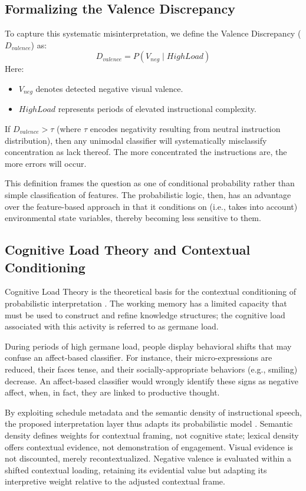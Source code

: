 \documentclass[conference]{IEEEtran}
\begin{document}
\subsection{Formalizing the Valence Discrepancy}
To capture this systematic misinterpretation, we define the Valence Discrepancy ($D_{valence}$) as:
\begin{equation}
D_{valence} = P(V_{neg} \mid HighLoad)
\end{equation}
Here:
\begin{itemize}
    \item $V_{neg}$ denotes detected negative visual valence.
    \item $HighLoad$ represents periods of elevated instructional complexity.
\end{itemize}

If $D_{valence} > \tau$ (where $\tau$ encodes negativity resulting from neutral instruction distribution), then any unimodal classifier will systematically misclassify concentration as lack thereof. The more concentrated the instructions are, the more errors will occur.

This definition frames the question as one of conditional probability rather than simple classification of features. The probabilistic logic, then, has an advantage over the feature-based approach in that it conditions on (i.e., takes into account) environmental state variables, thereby becoming less sensitive to them.

\subsection{Cognitive Load Theory and Contextual Conditioning}

Cognitive Load Theory is the theoretical basis for the contextual conditioning of probabilistic interpretation \cite{b5}. The working memory has a limited capacity that must be used to construct and refine knowledge structures; the cognitive load associated with this activity is referred to as germane load.

During periods of high germane load, people display behavioral shifts that may confuse an affect-based classifier. For instance, their micro-expressions are reduced, their faces tense, and their socially-appropriate behaviors (e.g., smiling) decrease. An affect-based classifier would wrongly identify these signs as negative affect, when, in fact, they are linked to productive thought.

By exploiting schedule metadata and the semantic density of instructional speech, the proposed interpretation layer thus adapts its probabilistic model \cite{b10}. Semantic density defines weights for contextual framing, not cognitive state; lexical density offers contextual evidence, not demonstration of engagement. Visual evidence is not discounted, merely recontextualized. Negative valence is evaluated within a shifted contextual loading, retaining its evidential value but adapting its interpretive weight relative to the adjusted contextual frame.
\end{document}

